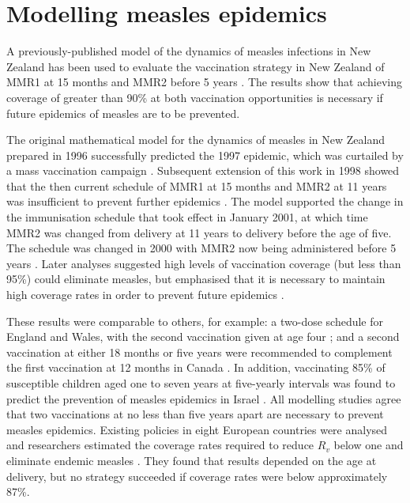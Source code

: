 \documentclass{article}
\begin{document}
\section{Modelling measles epidemics}
\label{section:epidemic_modelling}

A previously-published model of the dynamics of measles infections in New Zealand has been used to evaluate the vaccination strategy in New Zealand of MMR1 at 15 months and MMR2 before 5 years \citep{roberts0,roberts4,tobias98}. The results show that achieving coverage of greater than 90\% at both vaccination opportunities is necessary if future epidemics of measles are to be prevented.

The original mathematical model for the dynamics of measles in New Zealand prepared in 1996 \citep{tobias98} successfully predicted the 1997 epidemic, which was curtailed by a mass vaccination campaign \citep{mansoor98,roberts0}. Subsequent extension of this work in 1998 showed that the then current schedule of MMR1 at 15 months and MMR2 at 11 years was insufficient to prevent further epidemics \citep{roberts0}. The model supported the change in the immunisation schedule that took effect in January 2001, at which time MMR2 was changed from delivery at 11 years to delivery before the age of five. The schedule was changed in 2000 with MMR2 now being administered before 5 years \citep{anon2a}. Later analyses suggested high levels of vaccination coverage (but less than 95\%) could eliminate measles, but emphasised that it is necessary to maintain high coverage rates in order to prevent future epidemics \citep{roberts4}.

These results were comparable to others, for example: a two-dose schedule for England and Wales, with the second vaccination given at age four \citep{babad95}; and a second vaccination at either 18 months or five years were recommended to complement the first vaccination at 12 months in Canada \citep{gay98}. In addition, vaccinating 85\% of susceptible children aged one to seven years at five-yearly intervals was found to predict the prevention of measles epidemics in Israel \citep{agur93}. All modelling studies agree that two vaccinations at no less than five years apart are necessary to prevent measles epidemics. Existing policies in eight European countries were analysed and researchers estimated the coverage rates required to reduce $R_v$ below one and eliminate endemic measles \citep{wallinga1}. They found that results depended on the age at delivery, but no strategy succeeded if coverage rates were below approximately 87\%.
\end{document}
